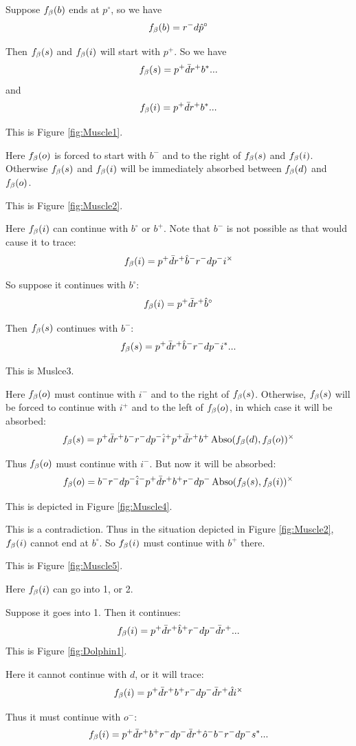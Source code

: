  \label{Muscle}
Suppose $f_\beta(b)$ ends at $p^\circ$, so we have
\[
f_\beta(b) = r^- d \hat{p}^\circ
\]

Then $f_\beta(s)$ and $f_\beta(i)$ will start with $p^+$. So we have
\[
f_\beta(s) = p^+ \bar{d} r^+ b^*...
\]
and
\[
f_\beta(i) = p^+ \bar{d} r^+ b^*...
\]

This is Figure \ref{fig:Muscle1}.

Here $f_\beta(o)$ is forced to start with $b^-$ and to the right of $f_\beta(s)$ and $f_\beta(i)$. Otherwise $f_\beta(s)$ and $f_\beta(i)$ will be immediately absorbed between $f_\beta(d)$ and $f_\beta(o)$.

This is Figure \ref{fig:Muscle2}.

Here $f_\beta(i)$ can continue with $b^\circ$ or $b^+$. Note that $b^-$ is not possible as that would cause it to trace:
\[
f_\beta(i) = p^+ \bar{d} r^+ \hat{b}^- r^- d p^- i^\times
\]

So suppose it continues with $b^\circ$:
\[
f_\beta(i) = p^+ \bar{d} r^+ \hat{b}^\circ
\]

Then $f_\beta(s)$ continues with $b^-$:
\[
f_\beta(s) = p^+ \bar{d} r^+ \hat{b}^- r^- d p^- i^*...
\]

This is Muslce3.

Here $f_\beta(o)$ must continue with $i^-$ and to the right of $f_\beta(s)$. Otherwise, $f_\beta(s)$ will be forced to continue with $i^+$ and to the left of $f_\beta(o)$, in which case it will be absorbed:
\[
f_\beta(s) = p^+ \bar{d} r^+ b^- r^- d p^- \hat{i}^+ p^+ \bar{d} r^+ b^+ \operatorname{Abso}(f_\beta(d), f_\beta(o))^\times
\]

Thus $f_\beta(o)$ must continue with $i^-$. But now it will be absorbed:
\[
f_\beta(o) = b^- r^- d p^- \hat{i}^- p^+ \bar{d} r^+ b^+ r^- d p^- \operatorname{Abso}(f_\beta(s), f_\beta(i))^\times
\]

This is depicted in Figure \ref{fig:Muscle4}.

This is a contradiction. Thus in the situation depicted in Figure \ref{fig:Muscle2}, $f_\beta(i)$ cannot end at $b^\circ$. So $f_\beta(i)$ must continue with $b^+$ there.

This is Figure \ref{fig:Muscle5}.

Here $f_\beta(i)$ can go into 1, or 2. 

 \label{Dolphin}
Suppose it goes into 1. Then it continues:
\[
f_\beta(i) = p^+ \bar{d} r^+ \hat{b}^+ r^- d p^- \bar{d} r^+... 
\]
This is Figure \ref{fig:Dolphin1}.

Here it cannot continue with $d$, or it will trace:
\[
f_\beta(i) = p^+ \bar{d} r^+ b^+ r^- d p^- \bar{d} r^+ \hat{d} i^\times
\]

Thus it must continue with $o^-$:
\[
f_\beta(i) = p^+ \bar{d} r^+ b^+ r^- d p^- \bar{d} r^+ \hat{o}^- b^- r^- d p^- s^*...
\]


